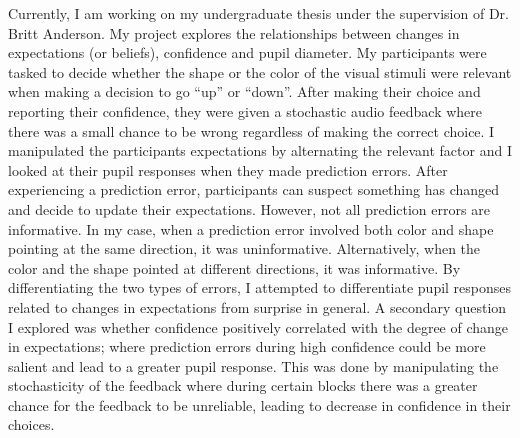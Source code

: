 \documentclass[12pt]{article}
\begin{document}
Currently, I am working on my undergraduate thesis under the supervision of Dr. Britt Anderson. My project explores the relationships between changes in expectations (or beliefs), confidence and pupil diameter. My participants were tasked to decide whether the shape or the color of the visual stimuli were relevant when making a decision to go “up” or “down”. After making their choice and reporting their confidence, they were given a stochastic audio feedback where there was a small chance to be wrong regardless of making the correct choice. I manipulated the participants expectations by alternating the relevant factor and I looked at their pupil responses when they made prediction errors. After experiencing a prediction error, participants can suspect something has changed and decide to update their expectations. However, not all prediction errors are informative. In my case, when a prediction error involved both color and shape pointing at the same direction, it was uninformative. Alternatively, when the color and the shape pointed at different directions, it was informative. By differentiating the two types of errors, I attempted to differentiate pupil responses related to changes in expectations from surprise in general. A secondary question I explored was whether confidence positively correlated with the degree of change in expectations; where prediction errors during high confidence could be more salient and lead to a greater pupil response. This was done by manipulating the stochasticity of the feedback where during certain blocks there was a greater chance for the feedback to be unreliable, leading to decrease in confidence in their choices.
\end{document}
